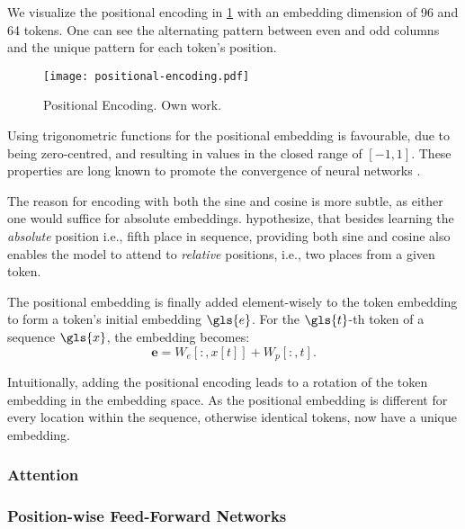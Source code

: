 We visualize the positional encoding in \cref{fig:positional-embedding} with an embedding dimension of 96 and 64 tokens. One can see the alternating pattern between even and odd columns and the unique pattern for each token's position.

\begin{figure}[ht]
  \centering
  \texttt{[image: positional-encoding.pdf]}
  \caption[Positional Encoding]{Positional Encoding. Own work.}
  \label{fig:positional-embedding}
\end{figure}

Using trigonometric functions for the positional embedding is favourable, due to being zero-centred, and resulting in values in the closed range of $[-1,1]$. These properties are long known to promote the convergence of neural networks \autocites[][8-9]{lecunEfficientBackProp2012}[][2]{ioffeBatchNormalizationAccelerating2015}.

The reason for encoding with both the sine and cosine is more subtle, as either one would suffice for absolute embeddings. \textcite[][6]{vaswaniAttentionAllYou2017} hypothesize, that besides learning the \emph{absolute} position i.e., fifth place in sequence, providing both sine and cosine also enables the model to attend to \emph{relative} positions, i.e., two places from a given token.

The positional embedding is finally added element-wisely to the token embedding to form a token's initial embedding $\gls{e}$. For the $\gls{t}$-th token of a sequence $\gls{x}$, the embedding becomes:
\begin{equation}
  \boldsymbol{e}=W_e[:, x[t]]+W_p[:, t].
  \label{eq:positional-embedding}
\end{equation}

Intuitionally, adding the positional encoding leads to a rotation of the token embedding in the embedding space. As the positional embedding is different for every location within the sequence, otherwise identical \glspl{token}, now have a unique embedding.

\subsubsection{Attention}\label{sec:attention}

\subsubsection{Position-wise Feed-Forward Networks}\label{sec:position-wise-ffn}

